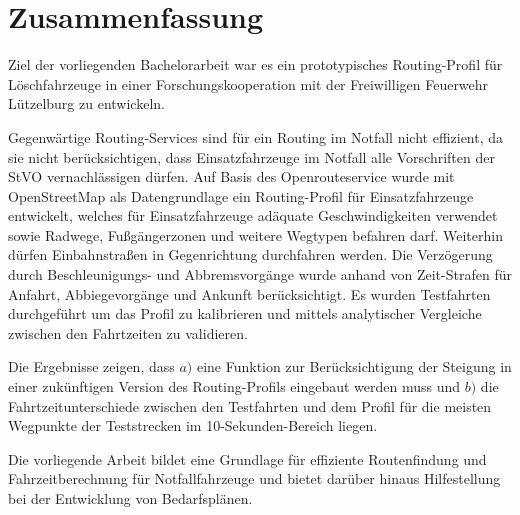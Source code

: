 {\centering\section*{Zusammenfassung}}

\vspace{1cm}

Ziel der vorliegenden Bachelorarbeit war es ein prototypisches Routing-Profil für Löschfahrzeuge in einer Forschungskooperation mit der Freiwilligen Feuerwehr Lützelburg zu entwickeln.
\medskip

Gegenwärtige Routing-Services sind für ein Routing im Notfall nicht effizient, da sie nicht berücksichtigen, dass Einsatzfahrzeuge im Notfall alle Vorschriften der StVO vernachlässigen dürfen.
Auf Basis des Openrouteservice wurde mit OpenStreetMap als Datengrundlage ein Routing-Profil für Einsatzfahrzeuge entwickelt, welches für Einsatzfahrzeuge adäquate Geschwindigkeiten verwendet sowie Radwege, Fußgängerzonen und weitere Wegtypen befahren darf. Weiterhin dürfen Einbahnstraßen in Gegenrichtung durchfahren werden.
Die Verzögerung durch Beschleunigungs- und Abbremsvorgänge wurde anhand von Zeit-Strafen für Anfahrt, Abbiegevorgänge und Ankunft berücksichtigt.
Es wurden Testfahrten durchgeführt um das Profil zu kalibrieren und mittels analytischer Vergleiche zwischen den Fahrtzeiten zu validieren.\par
Die Ergebnisse zeigen, dass \newline $a)$ eine Funktion zur Berücksichtigung der Steigung in einer zukünftigen Version des Routing-Profils eingebaut werden muss und \newline $b)$ die Fahrtzeitunterschiede zwischen den Testfahrten und dem Profil für die meisten Wegpunkte der Teststrecken im 10-Sekunden-Bereich liegen.
\bigskip

Die vorliegende Arbeit bildet eine Grundlage für effiziente Routenfindung und Fahrzeitberechnung für Notfallfahrzeuge und bietet darüber hinaus Hilfestellung bei der Entwicklung von Bedarfsplänen.
